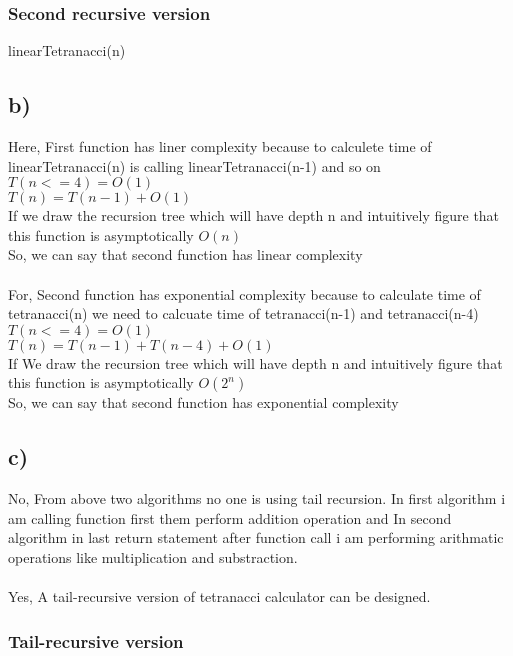 \documentclass[10pt, a4paper]{article}
\begin{document}
    \subsubsection*{Second recursive version}
    {\SetAlgoNoLine%
    \begin{algorithm}
        
            \DontPrintSemicolon %
            
            
        \EndFunction
        \caption{linearTetranacci(n)}
    \end{algorithm}}%
    
    \subsection*{b)}
    {Here, First function has liner complexity because to calculete time of linearTetranacci(n) is calling linearTetranacci(n-1) and so on\\}
    {$T(n<=4) = O(1)$\\}
    {$T(n) = T(n-1) + O(1)$} \\
    {If we draw the recursion tree which will have depth n and intuitively figure that this function is asymptotically $O(n)$\\}
    {So, we can say that second function has linear complexity\\\\}
    {For, Second function has exponential complexity because to calculate time of tetranacci(n) we need to calcuate time of tetranacci(n-1) and tetranacci(n-4) \\}
    {$T(n<=4) = O(1)$\\}
    {$T(n) = T(n-1) + T(n-4) + O(1)$} \\
    {If We draw the recursion tree which will have depth n and intuitively figure that this function is asymptotically $O(2^n)$\\}
    {So, we can say that second function has exponential complexity}
    
    
    \subsection*{c)}
    {No, From above two algorithms no one is using tail recursion. In first algorithm i am calling function first them perform addition operation and In second algorithm in last return statement after function call i am performing arithmatic operations like multiplication and substraction.\\\\}
    {Yes, A tail-recursive version of tetranacci calculator can be designed.}
    \subsubsection*{Tail-recursive version}
    
    
\end{document}
